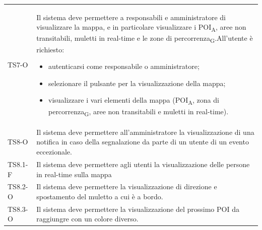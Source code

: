\begin{longtable}{ >{\centering}p{} >{}p{}}
	TS7-O & Il sistema deve permettere a responsabili e amministratore di visualizzare la mappa, e in particolare visualizzare i POI\textsubscript{A}, aree non transitabili, muletti in real-time e le zone di percorrenza\textsubscript{G}.\newline All'utente è richiesto:\begin{itemize} \item autenticarsi come responsabile o amministratore; \item selezionare il pulsante per la visualizzazione della mappa; \item visualizzare i vari elementi della mappa (POI\textsubscript{A}, zona di percorrenza\textsubscript{G}, aree non transitabili e muletti in real-time). \end{itemize}\tabularnewline
	
	TS8-O & Il sistema deve permettere all'amministratore la visualizzazione di una notifica in caso della segnalazione da parte di un utente di un evento eccezionale.\tabularnewline
	
	TS8.1-F & Il sistema deve permettere agli utenti la visualizzazione delle persone in real-time sulla mappa\tabularnewline
	
	TS8.2-O & Il sistema deve permettere la visualizzazione di direzione e spostamento del muletto a cui è a bordo. \tabularnewline
	
	TS8.3-O & Il sistema deve permettere la visualizzazione del prossimo POI da raggiungre con un colore diverso. \tabularnewline
	

\end{longtable}
